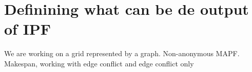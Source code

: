 \documentclass{article}
\theoremstyle{definition}
\begin{document}






\section{Definining what can be de output of IPF}
We are working on a grid represented by a graph. Non-anonymous MAPF\@. Makespan, working with  edge conflict and edge conflict only
\end{document}
